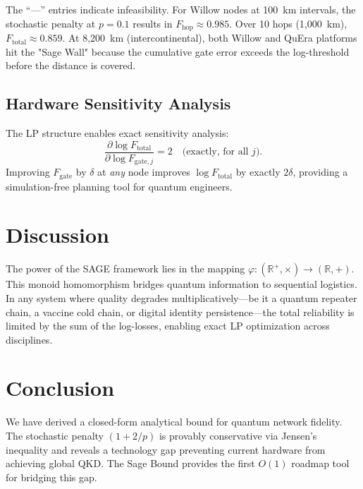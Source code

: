 \documentclass[aps,pra,reprint,amsmath,amssymb,superscriptaddress]{revtex4-2}
\begin{document}
The ``---'' entries indicate infeasibility. For Willow nodes at 100~km intervals, the stochastic penalty at $p=0.1$ results in $F_{\text{hop}} \approx 0.985$. Over 10 hops (1,000~km), $F_{\text{total}} \approx 0.859$. At 8,200~km (intercontinental), both Willow and QuEra platforms hit the "Sage Wall" because the cumulative gate error exceeds the log-threshold before the distance is covered.

\subsection{Hardware Sensitivity Analysis}

The LP structure enables exact sensitivity analysis:
\begin{equation}
\frac{\partial \log F_{\text{total}}}{\partial \log F_{\text{gate},j}} = 2 \quad \text{(exactly, for all } j\text{)} .
\label{eq:sensitivity}
\end{equation}
Improving $F_{\text{gate}}$ by $\delta$ at \emph{any} node improves $\log F_{\text{total}}$ by exactly $2\delta$, providing a simulation-free planning tool for quantum engineers.


\section{Discussion}

The power of the SAGE framework lies in the mapping $\varphi: (\mathbb{R}^+, \times) \to (\mathbb{R}, +)$. This monoid homomorphism bridges quantum information to sequential logistics. In any system where quality degrades multiplicatively—be it a quantum repeater chain, a vaccine cold chain, or digital identity persistence—the total reliability is limited by the sum of the log-losses, enabling exact LP optimization across disciplines.


\section{Conclusion}

We have derived a closed-form analytical bound for quantum network fidelity. The stochastic penalty $(1+2/p)$ is provably conservative via Jensen's inequality and reveals a technology gap preventing current hardware from achieving global QKD. The Sage Bound provides the first $O(1)$ roadmap tool for bridging this gap.
\end{document}
